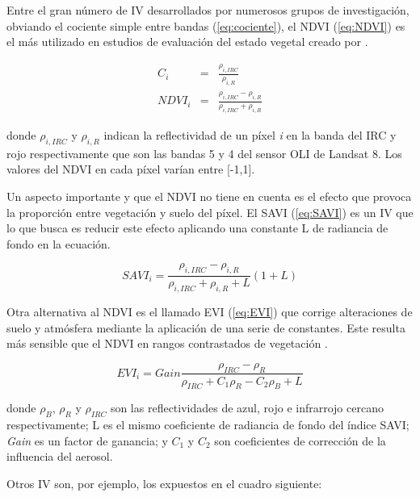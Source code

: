 Entre el gran número de \ac{IV} desarrollados por numerosos grupos de investigación, obviando el cociente simple entre bandas (\ref{eq:cociente}), el \ac{NDVI} (\ref{eq:NDVI}) es el más utilizado en estudios de evaluación del estado vegetal creado por \cite{rouse1974}.

\begin{eqnarray}\label{eq:cociente}
C_{i} & = & \frac{\rho_{i, IRC}}{\rho_{i, R}}\\
NDVI_{i} & = & \frac{\rho_{i, IRC}-\rho_{i, R}}{\rho_{i, IRC}+\rho_{i, R}}
\label{eq:NDVI}
\end{eqnarray}

\noindent donde $\rho_{i, IRC}$ y $\rho_{i, R}$ indican la reflectividad de un píxel \textit{i} en la banda del IRC y rojo respectivamente que son las bandas 5 y 4 del sensor \ac{OLI} de Landsat 8. Los valores del \ac{NDVI} en cada píxel varían entre [-1,1].%

Un aspecto importante y que el \ac{NDVI} no tiene en cuenta es el efecto que provoca la proporción entre vegetación y suelo del píxel. El \ac{SAVI} (\ref{eq:SAVI}) es un \ac{IV} que lo que busca es reducir este efecto aplicando una constante L de radiancia de fondo en la ecuación.

\begin{equation}
SAVI_{i}=\frac{\rho_{i, IRC}-\rho_{i, R}}{\rho_{i, IRC}+\rho_{i, R}+L}(1+L)
\label{eq:SAVI}
\end{equation}%

Otra alternativa al \ac{NDVI} es el llamado \ac{EVI} (\ref{eq:EVI}) que corrige alteraciones de suelo y atmósfera mediante la aplicación de una serie de constantes. Este resulta más sensible que el \ac{NDVI} en rangos contrastados de vegetación \citep{chuvieco2002teledeteccion}.

\begin{equation}
EVI_{i}=Gain\frac{\rho_{IRC}-\rho_{R}}{\rho_{IRC}+C_{1}\rho_{R}-C_{2}\rho_{B}+L}
\label{eq:EVI}
\end{equation}

\noindent donde $\rho_{B}$, $\rho_{R}$ y $\rho_{IRC}$ son las reflectividades de azul, rojo e infrarrojo cercano respectivamente; L es el mismo coeficiente de radiancia de fondo del índice \ac{SAVI}; \textit{Gain} es un factor de ganancia; y $C_{1}$ y $C_{2}$ son coeficientes de corrección de la influencia del aerosol.%

Otros \ac{IV} son, por ejemplo, los expuestos en el cuadro siguiente:

